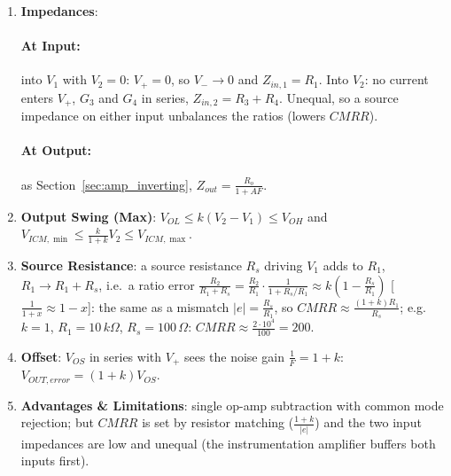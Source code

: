 \begin{enumerate}
\begin{align*}
      a &\approx k(1 + e)\left(1 - \frac{ke}{1 + k}\right) \hspace{1cm} [\tfrac{1}{1 + x} \approx 1 - x, \ |x| \ll 1] \\
      a &\approx k\left(1 + e - \frac{ke}{1 + k}\right) = k\left(1 + \frac{e}{1 + k}\right) \hspace{1cm} [e^2 \to 0] \\
      a - b &\approx \frac{k e}{1 + k} \hspace{1cm} \frac{a + b}{2} \approx k \hspace{1cm} \Rightarrow \hspace{1cm}
      CMRR \approx \frac{k}{\frac{k|e|}{1 + k}} = \frac{1 + k}{|e|}
    \end{align*}
  \item \textbf{Impedances}:
    \paragraph{At Input:} into \(V_1\) with \(V_2 = 0\): \(V_+ = 0\), so \(V_- \to 0\) and
    \(Z_{in,1} = R_1\). Into \(V_2\): no current enters \(V_+\), \(G_3\) and \(G_4\) in series,
    \(Z_{in,2} = R_3 + R_4\). Unequal, so a source impedance on either input unbalances
    the ratios (lowers \(CMRR\)).
    \paragraph{At Output:} as Section~\ref{sec:amp_inverting}, \(Z_{out} = \frac{R_o}{1 + AF}\).
  \item \textbf{Output Swing (Max)}: \(V_{OL} \leq k(V_2 - V_1) \leq V_{OH}\) and
    \(V_{ICM,\min} \leq \frac{k}{1 + k} V_2 \leq V_{ICM,\max}\).
  \item \textbf{Source Resistance}: a source resistance \(R_s\) driving \(V_1\) adds to \(R_1\),
    \(R_1 \to R_1 + R_s\), i.e.\ a ratio error \(\frac{R_2}{R_1 + R_s} = \frac{R_2}{R_1}\cdot\frac{1}{1 + R_s/R_1} \approx k\left(1 - \frac{R_s}{R_1}\right)\)
    [\(\frac{1}{1 + x} \approx 1 - x\)]: the same as a mismatch \(|e| = \frac{R_s}{R_1}\), so
    \(CMRR \approx \frac{(1 + k) R_1}{R_s}\); e.g.\ \(k = 1\), \(R_1 = 10\,k\Omega\), \(R_s = 100\,\Omega\): \(CMRR \approx \frac{2 \cdot 10^4}{100} = 200\).
  \item \textbf{Offset}: \(V_{OS}\) in series with \(V_+\) sees the noise gain \(\frac{1}{F} = 1 + k\):
    \(V_{OUT,error} = (1 + k) V_{OS}\).
  \item \textbf{Advantages \& Limitations}: single op-amp subtraction with common mode
    rejection; but \(CMRR\) is set by resistor matching (\(\frac{1 + k}{|e|}\)) and the two
    input impedances are low and unequal (the instrumentation amplifier buffers both
    inputs first).
\end{enumerate}

